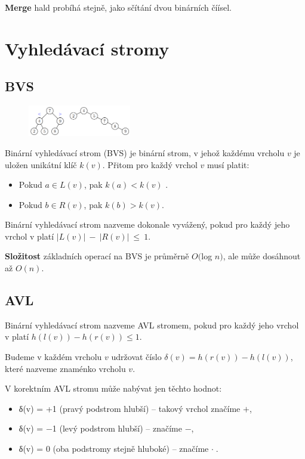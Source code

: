 \documentclass{szzclass}
\begin{document}
\textbf{Merge} hald probíhá stejně, jako sčítání dvou binárních číísel.


\newpage

\section{Vyhledávací stromy}

\subsection{BVS}

\begin{figure}[h]
\centering
\includegraphics[width=0.4\textwidth]{topics/bi-spol-05/images/bvs.png}
\end{figure}

Binární vyhledávací strom (BVS) je binární strom, v jehož
každému vrcholu $v$ je uložen unikátní klíč $k(v)$. Přitom pro každý
vrchol $v$ musí platit:
\begin{itemize}
    \item Pokud $a \in L(v)$, pak $k(a) < k(v)$ .
    \item Pokud $b \in R(v)$, pak $k(b) > k(v)$.
\end{itemize}

Binární vyhledávací strom nazveme dokonale vyvážený, pokud pro každý jeho vrchol v platí $|L(v)|~-~|R(v)|~\leq~1$.

\textbf{Složitost} základních operací na BVS je průměrně $O($log $n)$, ale může dosáhnout až $O(n)$.

\subsection{AVL}

Binární vyhledávací strom nazveme AVL stromem, pokud pro každý
jeho vrchol v platí $h(l(v)) − h(r(v)) \leq 1$.

Budeme v každém vrcholu $v$ udržovat číslo $δ(v) = h(r(v)) - h(l(v))$, které nazveme znaménko vrcholu $v$.

V korektním AVL stromu může nabývat jen těchto hodnot:
\begin{itemize}
    \item δ(v) = +1 (pravý podstrom hlubší) – takový vrchol značíme \textcircled{$+$},
    \item δ(v) = −1 (levý podstrom hlubší) – značíme \textcircled{$-$},
    \item δ(v) = 0 (oba podstromy stejně hluboké) – značíme \textcircled{$\cdot$}.
\end{itemize}
\end{document}
